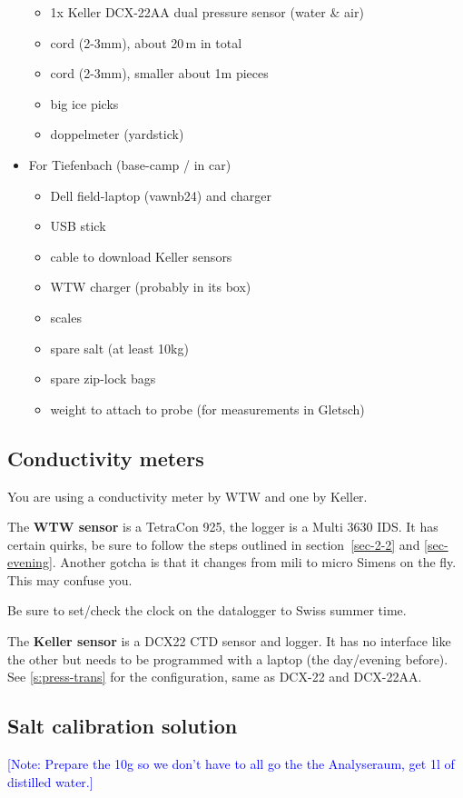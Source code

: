 \documentclass[DIV=15,halfparskip,11pt,headinclude]{scrartcl}
\newcommand{\note}[1]{\textcolor{blue}{[Note: #1]}}
\newcommand{\note}[1]{}
\begin{document}
\begin{itemize}
\begin{itemize}
  \item 1x Keller DCX-22AA dual pressure sensor (water \& air)
  \item cord (2-3mm), about 20\,m in total
  \item cord (2-3mm), smaller about 1m pieces
  \item big ice picks
  \item doppelmeter (yardstick)
  \end{itemize}
\item For Tiefenbach (base-camp / in car)
  \begin{itemize}
  \item Dell field-laptop (vawnb24) and charger
  \item USB stick
  \item cable to download Keller sensors
  \item WTW charger (probably in its box)
  \item scales
  \item spare salt (at least 10kg)
  \item spare zip-lock bags
  \item weight to attach to probe (for measurements in Gletsch)
  \end{itemize}
\end{itemize}


\subsection{Conductivity meters}
\label{s:cond-meters}

You are using a conductivity meter by WTW and one by Keller.

The \textbf{WTW sensor} is a TetraCon 925, the logger is a Multi 3630 IDS.  It
has certain quirks, be sure to follow the steps outlined in
section~\ref{sec-2-2} and \ref{sec-evening}.  Another gotcha is that
it changes from mili to micro Simens on the fly.  This may confuse
you.

Be sure to set/check the clock on the datalogger to Swiss summer time.

The \textbf{Keller sensor} is a DCX22 CTD sensor and logger.  It has
no interface like the other but needs to be programmed with a laptop
(the day/evening before).  See \ref{s:press-trans} for the
configuration, same as DCX-22 and DCX-22AA.

\subsection{Salt calibration solution}
\note{Prepare the 10g so we don't have to all go the the Analyseraum,
  get 1l of distilled water.}
\end{document}
